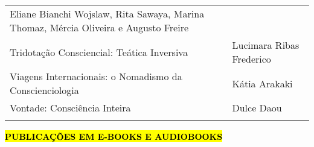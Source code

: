 \documentclass[
]{article}
\begin{document}
\begin{longtable}[]{@{}
  >{\raggedright\arraybackslash}p{}
  >{\raggedright\arraybackslash}p{}@{}}
\begin{minipage}[b]{\linewidth}
Eliane Bianchi Wojslaw, Rita Sawaya, Marina Thomaz, Mércia Oliveira e Augusto Freire
\end{minipage} \\
\begin{minipage}[b]{\linewidth}\raggedright
Tridotação Consciencial: Teática Inversiva
\end{minipage} & \begin{minipage}[b]{\linewidth}\raggedright
Lucimara Ribas Frederico
\end{minipage} \\
\begin{minipage}[b]{\linewidth}\raggedright
Viagens Internacionais: o Nomadismo da Conscienciologia
\end{minipage} & \begin{minipage}[b]{\linewidth}\raggedright
Kátia Arakaki
\end{minipage} \\
\begin{minipage}[b]{\linewidth}\raggedright
Vontade: Consciência Inteira
\end{minipage} & \begin{minipage}[b]{\linewidth}\raggedright
Dulce Daou
\end{minipage} \\
\midrule\noalign{}
\endhead
\bottomrule\noalign{}
\endlastfoot
\end{longtable}

\textbf{\hl{PUBLICAÇÕES EM E-BOOKS E AUDIOBOOKS}}
\end{document}
